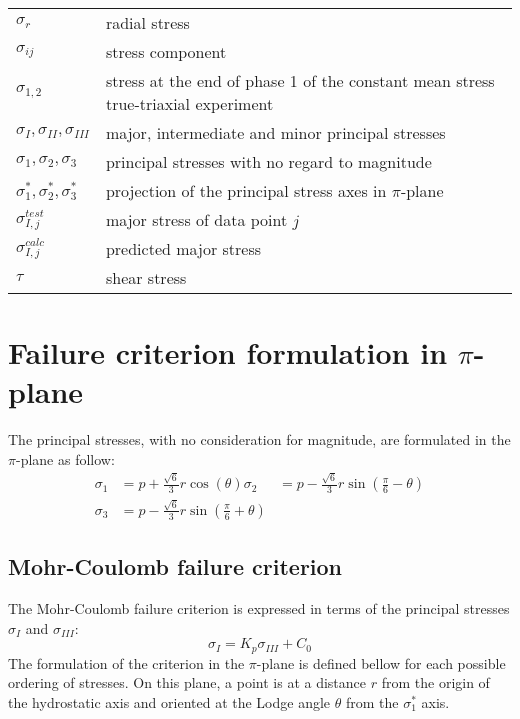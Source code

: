 \begin{table}
\begin{tabular}{ll}
        $\sigma_r$ & radial stress \\
        $\sigma_{ij}$ & stress component \\
        $\sigma_{1,2}$ & stress at the end of phase 1 of the constant mean stress true-triaxial experiment \\
        $\sigma_{I},\sigma_{II},\sigma_{III} $ & major, intermediate and minor principal stresses\\
        $\sigma_{1},\sigma_{2},\sigma_{3} $ & principal stresses with no regard to magnitude\\
        $\sigma_{1}^*,\sigma_{2}^*,\sigma_{3}^* $ & projection of the principal stress axes in $\pi$-plane \\
        $\sigma_{I,j}^{test}$ & major stress of data point $j$ \\
        $\sigma_{I,j}^{calc}$ & predicted major stress \\
        $\tau$ & shear stress \\
    \end{tabular}
\end{table}

\chapter{Failure criterion formulation in \texorpdfstring{$\pi$}{pi}-plane}\label{App:B}

The principal stresses, with no consideration for magnitude, are formulated in the $\pi$-plane as follow: 
\begin{align}
    \sigma_1 &= p + \frac{\sqrt{6}}{3}r\cos\left(\theta\right) 
    \sigma_2 &= p - \frac{\sqrt{6}}{3}r\sin\left(\frac{\pi}{6}-\theta\right)\\
    \sigma_3 &= p - \frac{\sqrt{6}}{3}r\sin\left(\frac{\pi}{6}+\theta\right)
\end{align}

\section*{Mohr-Coulomb failure criterion}
The Mohr-Coulomb failure criterion is expressed in terms of the principal stresses $\sigma_I$ and $\sigma_{III}$:
\begin{equation}
    \sigma_I = K_p \sigma_{III} + C_0
\end{equation}
The formulation of the criterion in the $\pi$-plane is defined bellow for each possible ordering of stresses. On this plane, a point is at a distance $r$ from the origin of the hydrostatic axis and oriented at the Lodge angle $\theta$ from the  $\sigma_1^*$ axis.

